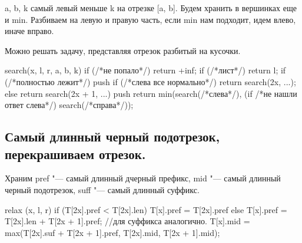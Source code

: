 a, b, k самый левый меньше k на отрезке [a, b]. Будем хранить в вершинках еще и min. Разбиваем на левую и правую
часть, если min нам подходит, идем влево, иначе вправо.

Можно решать задачу, представляя отрезок разбитый на кусочки.

\begin{cppcode}
search(x, l, r, a, b, k) {
    if (/*не попало*/) return +inf;
    if (/*лист*/) return l;
    if (/*полностью лежит*/) {
        push
        if (/*слева все нормально*/) 
            return search(2x, ...);
        else return search(2x + 1, ...)
    }
    push
    return min(search(/*слева*/), (if /*не нашли ответ слева*/) search(/*справа*/));
}
\end{cppcode}

\subsection{Самый длинный черный подотрезок, перекрашиваем отрезок.}

Храним pref "--- самый длинный дчерный префикс, mid "--- самый длинный черный подотрезок, suff "--- самый длинный суффикс.
\begin{cppcode}
relax (x, l, r)
    if (T[2x].pref < T[2x].len) {
       T[x].pref = T[2x].pref
    } else {
       T[x].pref = T[2x].len + T[2x + 1].pref;
    }
    //для суффикса аналогично.
    T[x].mid = max(T[2x].suf + T[2x  + 1].pref, T[2x].mid, T[2x + 1].mid);                                      
\end{cppcode}